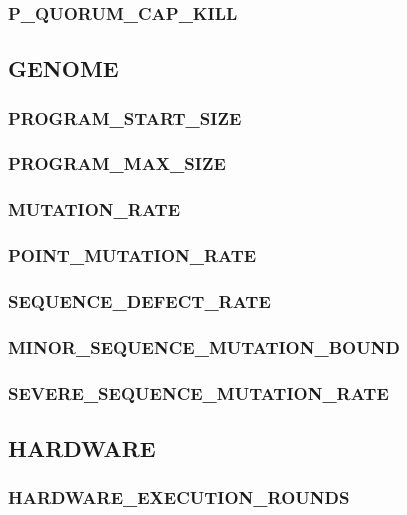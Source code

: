 \subsubsection{P\_QUORUM\_CAP\_KILL}

\subsection{GENOME}

\subsubsection{PROGRAM\_START\_SIZE}

\subsubsection{PROGRAM\_MAX\_SIZE}

\subsubsection{MUTATION\_RATE}

\subsubsection{POINT\_MUTATION\_RATE}

\subsubsection{SEQUENCE\_DEFECT\_RATE}

\subsubsection{MINOR\_SEQUENCE\_MUTATION\_BOUND}

\subsubsection{SEVERE\_SEQUENCE\_MUTATION\_RATE}

\subsection{HARDWARE}

\subsubsection{HARDWARE\_EXECUTION\_ROUNDS}

